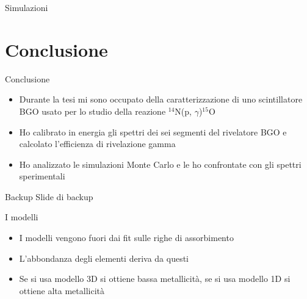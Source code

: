 \documentclass [xcolor=svgnames, 9pt] {beamer}
\begin{document}
\begin{frame}{Simulazioni}
\begin{table}[h]
\end{table}%
\end{frame}
	
	\section{Conclusione}
	\begin{frame}{Conclusione}
		\begin{itemize}
			\item Durante la tesi mi sono occupato della caratterizzazione di uno scintillatore BGO usato per lo studio della reazione  $^{14}$N(p, $\gamma$)$^{15}$O
			\item Ho calibrato in energia gli spettri dei sei segmenti del rivelatore BGO e calcolato l'efficienza di rivelazione gamma
			\item Ho analizzato le simulazioni Monte Carlo e le ho confrontate con gli spettri sperimentali
		\end{itemize}
		\vspace{8mm}
	\end{frame}
	
\begin{frame}[noframenumbering]{Backup}
	\centering
	Slide di backup
\end{frame}

\begin{frame}[noframenumbering]{I modelli}
	\begin{itemize}
		\item I modelli vengono fuori dai fit sulle righe di assorbimento
		\item L'abbondanza degli elementi deriva da questi
		\item Se si usa modello 3D si ottiene bassa metallicità, se si usa modello 1D si ottiene alta metallicità
	\end{itemize}
\end{frame}
\end{document}
